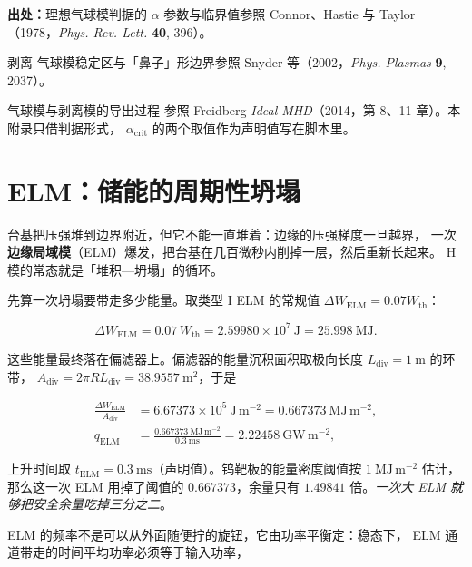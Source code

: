 {\footnotesize
\textbf{出处：}理想气球模判据的 $\alpha$ 参数与临界值参照 Connor、Hastie 与 Taylor
（1978，\emph{Phys. Rev. Lett.} \textbf{40}, 396）。

剥离-气球模稳定区与「鼻子」形边界参照
Snyder 等（2002，\emph{Phys. Plasmas} \textbf{9}, 2037）。

气球模与剥离模的导出过程
参照 Freidberg \emph{Ideal MHD}（2014，第 8、11 章）。本附录只借判据形式，
$\alpha_{\mathrm{crit}}$ 的两个取值作为声明值写在脚本里。
}

\section{ELM：储能的周期性坍塌}
\label{sec:app-ad-elm}

台基把压强堆到边界附近，但它不能一直堆着：边缘的压强梯度一旦越界，
一次\textbf{边缘局域模}（ELM）爆发，把台基在几百微秒内削掉一层，然后重新长起来。
H 模的常态就是「堆积—坍塌」的循环。

先算一次坍塌要带走多少能量。取类型 I ELM 的常规值 $\Delta W_{\mathrm{ELM}}=0.07W_{\mathrm{th}}$：

\begin{equation}
\Delta W_{\mathrm{ELM}}=0.07\,W_{\mathrm{th}}=2.59980\times10^{7}\ \mathrm{J}=25.998\ \mathrm{MJ}.
\label{eq:app-ad-dwelm}
\end{equation}

这些能量最终落在偏滤器上。偏滤器的能量沉积面积取极向长度 $L_{\mathrm{div}}=1\ \mathrm{m}$ 的环带，
$A_{\mathrm{div}}=2\pi RL_{\mathrm{div}}=38.9557\ \mathrm{m^2}$，于是

\begin{equation}
\begin{aligned}
\frac{\Delta W_{\mathrm{ELM}}}{A_{\mathrm{div}}}&=6.67373\times10^{5}\ \mathrm{J\,m^{-2}}
=0.667373\ \mathrm{MJ\,m^{-2}},\\
q_{\mathrm{ELM}}&=\frac{0.667373\ \mathrm{MJ\,m^{-2}}}{0.3\ \mathrm{ms}}
=2.22458\ \mathrm{GW\,m^{-2}},
\end{aligned}
\label{eq:app-ad-eden}
\end{equation}

上升时间取 $t_{\mathrm{ELM}}=0.3\ \mathrm{ms}$（声明值）。钨靶板的能量密度阈值按 $1\ \mathrm{MJ\,m^{-2}}$
估计，那么这一次 ELM 用掉了阈值的 $0.667373$，余量只有 $1.49841$ 倍。\emph{一次大 ELM 就够把安全余量吃掉三分之二}。

ELM 的频率不是可以从外面随便拧的旋钮，它由功率平衡定：稳态下，
ELM 通道带走的时间平均功率必须等于输入功率，


